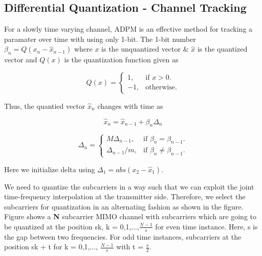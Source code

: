 \documentclass[conference]{IEEEtran}
\begin{document}




\subsection{Differential Quantization - Channel Tracking}
\label{quantiz}

For a slowly time varying channel, ADPM is an effective method for tracking a paramater over time with using only 1-bit. The 1-bit number $\beta_{n} = Q(x_{n} - \hat{x}_{n-1})$ where $x$ is the unquantized vector $\&$ $\hat{x}$ is the quantized vector and $Q(x)$ is the quantization function given as



\begin{equation}
  Q(x)=\begin{cases}
    1, & \text{if $x>0$}.\\
    -1, & \text{otherwise}.
  \end{cases}
\end{equation}

Thus, the quantied vector $\hat{x}_n$ changes with time as

\begin{equation}
\hat{x}_{n} = \hat{x}_{n-1} + \beta_{n}\Delta_{n}
\end{equation}

\begin{equation}
\label{delta_eqn}
\Delta_{n} = \begin{cases}
    M \Delta_{n-1}, & \text{if $\beta_{n} = \beta_{n-1}$}.\\
    \Delta_{n-1}/m , & \text{if $\beta_{n} \neq \beta_{n-1}$}.
  \end{cases}
\end{equation}

Here we initialize delta using $\Delta_1 = abs(x_{2}-\hat{x}_1)$.

We need to quantize the subcarriers in a way such that we can exploit
the joint time-frequency interpolation at the transmitter
side. Therefore, we select the subcarriers for quantization in an
alternating fashion as shown in the figure. Figure shows a \textbf{N}
subcarrier MIMO channel with subcarriers which are going to be
quantized at the position sk, k = 0,1,...,$\frac{N-1}{s}$ for even
time instance. Here, s is the gap between two frequencies. For odd
time instances, subcarriers at the position sk + t for k = 0,1,...,
$\frac{N-1}{s}$ with t = ${\frac{s}{2}}$.
\end{document}
